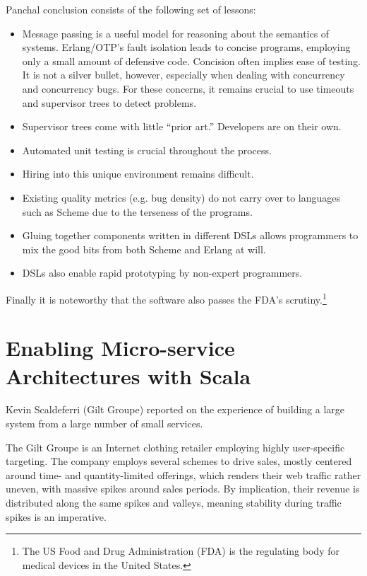 \documentclass{jfp1}
\begin{document}
Panchal conclusion consists of the following set of lessons: 
\begin{itemize}

\item Message passing is a useful model for reasoning about the semantics
of systems. Erlang/OTP's fault isolation leads to concise programs,
employing only a small amount of defensive code. Concision often implies
ease of testing. It is not a silver bullet, however, especially when
dealing with concurrency and concurrency bugs. For these concerns, it
remains crucial to use timeouts and supervisor trees to detect problems. 

\item Supervisor trees come with little ``prior art.'' Developers are on
their own.

\item Automated unit testing is crucial throughout the process.

\item Hiring into this unique environment remains difficult. 

\item Existing quality metrics (e.g. bug density) do not carry over to
languages such as Scheme due to the terseness of the programs. 

\item Gluing together components written in different DSLs allows
programmers to mix the good bits from both Scheme and Erlang at will. 

\item DSLs also enable rapid prototyping by non-expert programmers. 
\end{itemize}
Finally it is noteworthy that the software also passes the FDA's
scrutiny.\footnote{The US Food and Drug Administration (FDA) is the regulating body for medical devices in
the United States.}

\section{Enabling Micro-service Architectures with Scala}


Kevin Scaldeferri (Gilt Groupe) reported on the experience of building a
large system from a large number of small services.

The Gilt Groupe is an Internet clothing retailer employing highly
user-specific targeting. The company employs several schemes to drive
sales, mostly centered around time- and quantity-limited offerings, which
renders their web traffic rather uneven, with massive spikes around sales
periods. By implication, their revenue is distributed along the same
spikes and valleys, meaning stability during traffic spikes is an
imperative.
\end{document}
